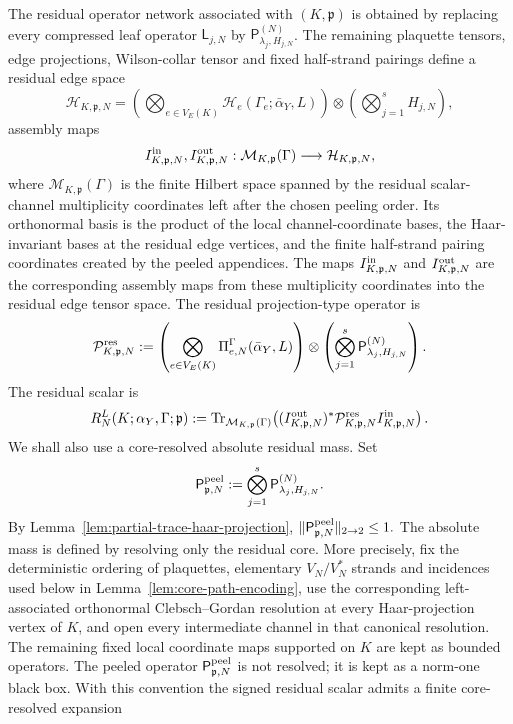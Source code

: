 \documentclass[11pt,a4paper,reqno]{amsart}
\theoremstyle{definition}
\theoremstyle{remark}
\newcommand\Tr{{\mathrm{Tr}}}
\begin{document}
The residual operator network associated with $(K,\mathfrak p)$ is obtained by replacing every compressed leaf operator $\mathsf L_{j,N}$ by $\mathsf P_{\lambda_j,H_{j,N}}^{(N)}$.  The remaining plaquette tensors, edge projections, Wilson-collar tensor and fixed half-strand pairings define a residual edge space
\[
\mathcal H_{K,\mathfrak p,N}
=
\left(\bigotimes_{e\in V_E(K)}
\mathcal H_e(\Gamma_e;\bar\alpha_Y,L)\right)
\otimes
\left(\bigotimes_{j=1}^s H_{j,N}\right),
\]
assembly maps
\[
I^{\rm in}_{K,\mathfrak p,N},
I^{\rm out}_{K,\mathfrak p,N}:
\mathcal M_{K,\mathfrak p}(\Gamma)
\longrightarrow \mathcal H_{K,\mathfrak p,N},
\]
where $\mathcal M_{K,\mathfrak p}(\Gamma)$ is the finite Hilbert space spanned by the residual scalar-channel multiplicity coordinates left after the chosen peeling order.  Its orthonormal basis is the product of the local channel-coordinate bases, the Haar-invariant bases at the residual edge vertices, and the finite half-strand pairing coordinates created by the peeled appendices.  The maps $I^{\rm in}_{K,\mathfrak p,N}$ and $I^{\rm out}_{K,\mathfrak p,N}$ are the corresponding assembly maps from these multiplicity coordinates into the residual edge tensor space.  The residual projection-type operator is
\[
\mathcal P^{\rm res}_{K,\mathfrak p,N}
:=
\left(\bigotimes_{e\in V_E(K)}
\Pi^\Gamma_{e,N}(\bar\alpha_Y,L)\right)
\otimes
\left(\bigotimes_{j=1}^s
\mathsf P_{\lambda_j,H_{j,N}}^{(N)}\right).
\]
The residual scalar is
\begin{equation}\label{eq:residual-scalar-definition}
R_N^L(K;\alpha_Y,\Gamma;\mathfrak p)
:=
\Tr_{\mathcal M_{K,\mathfrak p}(\Gamma)}\!\left(
(I^{\rm out}_{K,\mathfrak p,N})^*
\mathcal P^{\rm res}_{K,\mathfrak p,N}
I^{\rm in}_{K,\mathfrak p,N}
\right).
\end{equation}
We shall also use a core-resolved absolute residual mass.  Set
\[
\mathsf P^{\rm peel}_{\mathfrak p,N}:=\bigotimes_{j=1}^s\mathsf P^{(N)}_{\lambda_j,H_{j,N}} .
\]
By Lemma~\ref{lem:partial-trace-haar-projection}, $\|\mathsf P^{\rm peel}_{\mathfrak p,N}\|_{2\to2}\le 1.$ The absolute mass is defined by resolving only the residual core.  More precisely, fix the deterministic ordering of plaquettes, elementary $V_N/V_N^*$ strands and incidences used below in Lemma~\ref{lem:core-path-encoding}, use the corresponding left-associated orthonormal Clebsch--Gordan resolution at every Haar-projection vertex of $K$, and open every intermediate channel in that canonical resolution.  The remaining fixed local coordinate maps supported on $K$ are kept as bounded operators.  The peeled operator $\mathsf P^{\rm peel}_{\mathfrak p,N}$ is not resolved; it is kept as a norm-one black box.  With this convention the signed residual scalar admits a finite core-resolved expansion
\end{document}
